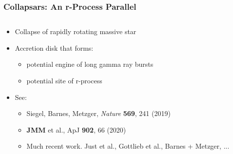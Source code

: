 \documentclass[]{beamer}
\begin{document}
\begin{frame}
  \frametitle{Collapsars: An r-Process Parallel}
  \begin{columns}
    \begin{column}{6cm}
      \begin{itemize}
      \item Collapse of rapidly rotating massive star
      \item Accretion disk that forms:
        \begin{itemize}
        \item potential engine of long gamma ray bursts
        \item potential site of r-process
        \end{itemize}
      \item See:
        \begin{itemize}
        \item Siegel, Barnes, Metzger, \textit{Nature} \textbf{569}, 241 (2019)
        \item \textbf{JMM} et al., ApJ \textbf{902}, 66 (2020)
        \item Much recent work. Just et al., Gottlieb et al., Barnes + Metzger, ...
        \end{itemize}
      \end{itemize}
    \end{column}
    \begin{column}{6cm}
\end{column}
\end{columns}
\end{frame}
\end{document}
